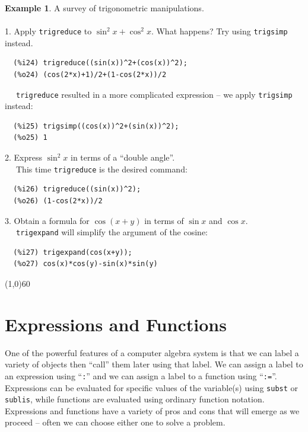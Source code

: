 \documentclass[10.5pt,twoside]{report}
\theoremstyle{definition}
\newtheorem{exmp}{Example}[section]
\begin{document}
\begin{exmp}  A survey of trigonometric manipulations.\\
${}$\\

1.  Apply \verb|trigreduce| to $\sin^2{x}+\cos^2{x}$.  What happens?  Try using \verb|trigsimp| instead.\\  

\begin{verbatim}
  (%i24) trigreduce((sin(x))^2+(cos(x))^2);
  (%o24) (cos(2*x)+1)/2+(1-cos(2*x))/2
\end{verbatim}

\verb|  | \verb|trigreduce| resulted in a more complicated expression -- we apply \verb|trigsimp| instead:

\begin{verbatim}
  (%i25) trigsimp((cos(x))^2+(sin(x))^2);
  (%o25) 1
\end{verbatim}

2.  Express $\sin^2{x}$ in terms of a ``double angle''.\\

\verb|  | This time \verb|trigreduce| is the desired command:

\begin{verbatim}
  (%i26) trigreduce((sin(x))^2);
  (%o26) (1-cos(2*x))/2
\end{verbatim}

3.  Obtain a formula for $\cos{(x+y)}$ in terms of $\sin{x}$ and $\cos{x}$.\\

\verb|  | \verb|trigexpand| will simplify the argument of the cosine:

\begin{verbatim}
  (%i27) trigexpand(cos(x+y));
  (%o27) cos(x)*cos(y)-sin(x)*sin(y)
\end{verbatim}


\end{exmp}
\line(1,0){60}
\linethickness{0.5mm}

\pagebreak

\section{Expressions and Functions}\label{Expressions and Functions}

One of the powerful features of a computer algebra system is that we can label a variety of objects then ``call'' them later using that label.  We can assign a label to an expression using ``\verb|:|'' and we can assign a label to a function using ``\verb|:=|''.  Expressions can be evaluated for specific values of the variable(s) using \verb|subst| or \verb|sublis|, while functions are evaluated using ordinary function notation.  Expressions and functions have a variety of pros and cons that will emerge as we proceed -- often we can choose either one to solve a problem.
\end{document}

